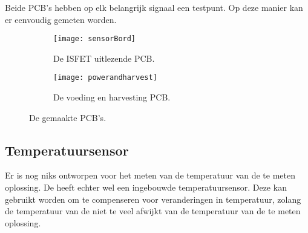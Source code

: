 Beide PCB's hebben op elk belangrijk signaal een testpunt. Op deze manier kan er eenvoudig gemeten worden.


\begin{figure}[!htbp]
    \centering
    \begin{subfigure}[b]{0.48\textwidth}
        \centering
        \texttt{[image: sensorBord]}
        \caption{De ISFET uitlezende PCB.}
        \label{fig:sensorPCB}
    \end{subfigure}
    \hfill
    \begin{subfigure}[b]{0.60\textwidth}
        \centering
        \texttt{[image: powerandharvest]}
        \caption{De voeding en harvesting PCB.}
        \label{fig:powerPCB}
    \end{subfigure}
    \caption{De gemaakte PCB's.}
    \label{fig:PCBs}
\end{figure}


\subsection{Temperatuursensor}

Er is nog niks ontworpen voor het meten van de temperatuur van de te meten oplossing. De \mcu heeft echter wel een ingebouwde temperatuursensor.
Deze kan gebruikt worden om te compenseren voor veranderingen in temperatuur, zolang de temperatuur van de \mcu niet te veel afwijkt van de temperatuur van de te meten oplossing.


